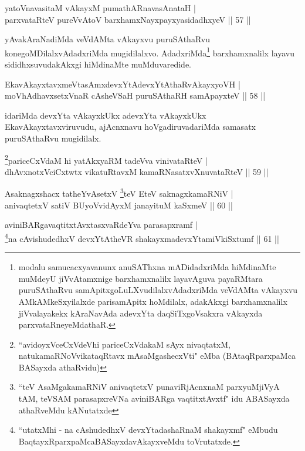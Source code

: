 \begin{shl}
yatoV\s navasitaM vAkayxM pumathARnavasAnataH |\\
parxvataRteV pureVvAtoV barxhamxNayxpayxyasidadhxyeV \hfill || 57 ||
\end{shl}

\begin{artha}
yAvakAraNadiMda veVdAMta vAkayxvu puruSAthaRvu konegoMDilalxvAdadxriMda mugidilalxvo. AdadxriMda\footnote{modalu samucacxyavanunx anuSAThxna mADidadxriMda hiMdinaMte muMdeyU jiVvAtamxnige barxhamxnalilx layavAguva payaRMtara puruSAthaRvu samApitxgoLuLXvudilalxvAdadxriMda veVdAMta vAkayxvu AMkAMkeSxyilalxde parisamApitx hoMdilalx, adakAkxgi barxhamxnalilx jiVvalayakekx kAraNavAda adevxYta daqSiTxgoVsakxra vAkayxda parxvataRneyeMdathaR.} barxhamxnalilx layavu sididhxsuvudakAkxgi hiMdinaMte muMduvaredide.
\end{artha}

\begin{shl}
EkavAkayxtavxmeVtasAmxdevxYtAdevxYtAthaRvAkayxyoVH |\\
moVhAdhavxsetxVnaR cAsheVSaH puruSAthaRH samApayxteV \hfill || 58 ||
\end{shl}

\begin{artha}
idariMda devxYta vAkayxkUkx adevxYta vAkayxkUkx EkavAkayxtavxviruvudu, ajAcnxnavu hoVgadiruvadariMda samasatx puruSAthaRvu mugidilalx.
\end{artha}

\begin{shl}
\footnote{``avidoyxVceCxVdeVhi pariceCxVdakaM sAyx nivaqtatxM, natukamaRNoVvikataqRtavx mAsaMgashecxVti" eMba (BAtaqRparxpaMca BASayxda athaRvidu)}pariceCxVdaM hi yatAkxyaRM tadeVva vinivataRteV |\\
dhAvxnotxVciCxtwtx vikatuRtavxM kamaRNasatxvXnuvataRteV \hfill || 59 ||
\end{shl}

\begin{shl}
Asaknagxshacx tatheYvA\s \s setxV \footnote{``teV AsaMgakamaRNiV anivaqtetxV punaviRjAcnxnaM parxyuMjiVyA tAM, teVSAM parasapxreVNa aviniBARga vaqtitxtAvxtf" idu ABASayxda athaRveMdu  kANutatxde }teV EteV saknagxkamaRNiV |\\
anivaqtetxV satiV BUyoV\s vidAyxM janayituM kaSxmeV \hfill || 60 ||
\end{shl}


\begin{shl}
aviniBARgavaqtitxtAvxtasxvaRdeYva parasapxramf |\\
\footnote{``utatxMhi - na cAshudedhxV devxYtadashaRnaM shakayxmf" eMbudu BaqtayxRparxpaMcaBASayxdavAkayxveMdu toVrutatxde.}na cAvishudedhxV devxYtAtheVR shakayxmadevxYtamiVkiSxtumf \hfill || 61 ||
\end{shl}


